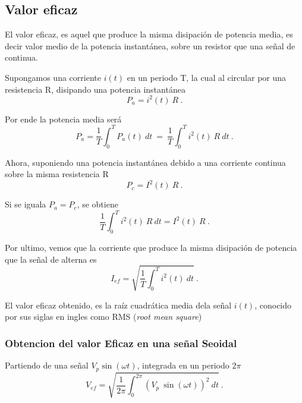 \subsection{Valor eficaz}

    El valor eficaz, es aquel que produce la misma disipación de potencia 
    media, es decir valor medio de la potencia instantánea, sobre un 
    resistor que una señal de continua.
    
    \noindent Supongamos una corriente \(i(t)\) en un periodo T, la cual 
    al circular por una resistencia R, disipando una potencia instantánea 
    \begin{equation*}
        P_a = i^2(t)~R~.
    \end{equation*}

    \noindent Por ende la potencia media será
    \begin{equation*}
        P_a = \dfrac{1}{T} \int_{0}^{T} P_a(t)~dt ~ = ~ 
        \dfrac{1}{T} \int_{0}^{T} i^2(t)~R~dt ~.
    \end{equation*}

    \noindent Ahora, suponiendo una potencia instantánea debido a una 
    corriente continua sobre la misma resistencia R
    \begin{equation*}
        P_c = I^2(t)~R~.
    \end{equation*} 

    \noindent Si se iguala \(P_a = P_c\), se obtiene 
    \begin{equation*}
        \dfrac{1}{T} \int_{0}^{T} i^2(t)~R~dt = I^2(t)~R~.    
    \end{equation*}

    \noindent Por ultimo, vemos que la corriente que produce la
    misma disipación de potencia que la señal de alterna es 
    \begin{equation*}
        I_{ef} = \sqrt{\dfrac{1}{T} \int_{0}^{T} i^2(t)~dt}~.
    \end{equation*}

    \noindent El valor eficaz obtenido, es la raíz cuadrática media
    dela señal \(i(t)\), conocido por sus siglas en ingles como RMS 
    (\textit{root mean square}) 

        \subsubsection{Obtencion del valor Eficaz en una señal Seoidal}

            Partiendo de una señal \(V_p\sin(\omega t)\), integrada en un 
            periodo \(2\pi\)
            \begin{equation*}
                V_{ef} = \sqrt{\dfrac{1}{2\pi} \int_{0}^{2\pi} (V_p~\sin(\omega t))^2~dt}~.        
            \end{equation*}
            
